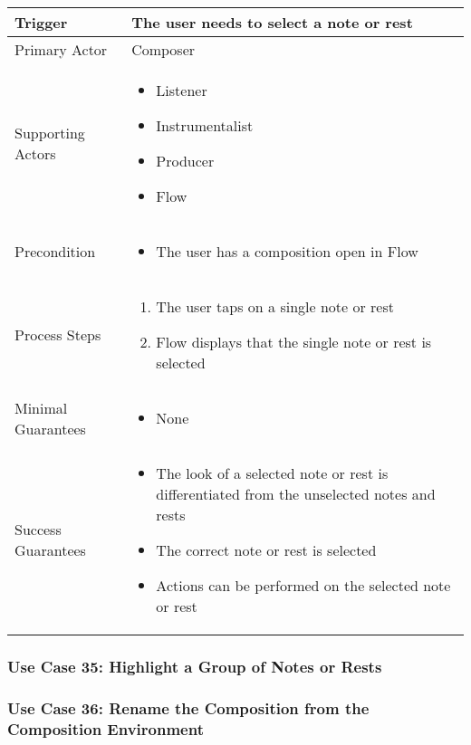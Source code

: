   \begin{tabularx}{\textwidth}{|X|X|}
  \hline
  Trigger & 
  The user needs to select a note or rest \\
  \hline
  Primary Actor & 
  Composer \\
  \hline
  Supporting Actors & 
  \begin{itemize}
  \item Listener
  \item Instrumentalist
  \item Producer
  \item Flow
  \end{itemize} \\
  \hline
  Precondition & 
  \begin{itemize}
  \item The user has a composition open in Flow
  \end{itemize} \\
  \hline
  Process Steps & 
  \begin{enumerate}
  \item The user taps on a single note or rest
  \item Flow displays that the single note or rest is selected
  \end{enumerate} \\
  \hline
  Minimal Guarantees & 
  \begin{itemize}
    \item None
  \end{itemize} \\
  \hline
  Success Guarantees & 
  \begin{itemize}
    \item The look of a selected note or rest is differentiated from the unselected notes and rests
    \item The correct note or rest is selected
    \item Actions can be performed on the selected note or rest
  \end{itemize} \\
  \hline
  \end{tabularx}


  \subsubsection{Use Case 35: Highlight a Group of Notes or Rests}


  \subsubsection{Use Case 36: Rename the Composition from the Composition Environment}

